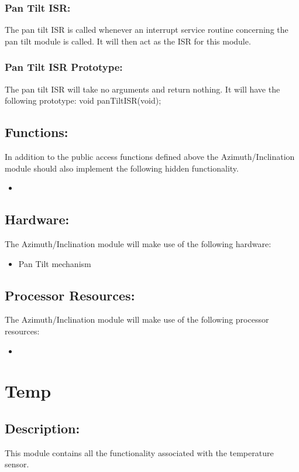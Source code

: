 \documentclass[]{article}
\begin{document}
\subsubsection{Pan Tilt ISR:}
The pan tilt ISR is called whenever an interrupt service routine concerning the pan tilt module is called. It will then act as the ISR for this module.

\subsubsection{Pan Tilt ISR Prototype:}
The pan tilt ISR will take no arguments and return nothing. It will have the following prototype: \newline \newline 
void panTiltISR(void);

\subsection{Functions:}
In addition to the public access functions defined above the Azimuth/Inclination module should also implement the following hidden functionality.
\begin{itemize}
	\item 
\end{itemize}

\subsection{Hardware:}
The Azimuth/Inclination module will make use of the following hardware:
\begin{itemize}
	\item Pan Tilt mechanism
\end{itemize}

\subsection{Processor Resources:}
The Azimuth/Inclination module will make use of the following processor resources:
\begin{itemize}
	\item 
\end{itemize}

\newpage
\section{Temp}

\subsection{Description:}
This module contains all the functionality associated with the temperature sensor.
\end{document}
